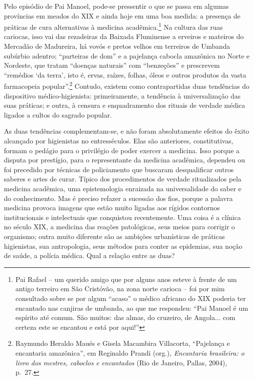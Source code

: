Pelo episódio de Pai Manoel, pode-se pressentir o que se passa em
algumas províncias em meados do XIX e ainda hoje em uma boa medida: a
presença de práticas de cura alternativas à medicina
acadêmica.\footnote{Pai Rafael -- um querido amigo que por alguns anos
  esteve à frente de um antigo terreiro em São Cristóvão, na zona norte
  carioca -- foi por mim consultado sobre se por algum ``acaso'' o
  médico africano do XIX poderia ter encantado nas canjiras de umbanda,
  ao que me respondeu: ``Pai Manoel é um espírito até comum. São muitos:
  das almas, do cruzeiro, de Angola... com certeza este se encantou e
  está por aqui!''} Na cultura das ruas cariocas, isso vai das
rezadeiras da Baixada Fluminense a erveiros e mateiros do Mercadão de
Madureira, há vovós e pretos velhos em terreiros de Umbanda subúrbio
adentro; ``parteiras de dom'' e a pajelança cabocla amazônica no Norte e
Nordeste, que tratam ``doenças naturais'' com ``benzeções'' e prescrevem
``remédios `da terra', isto é, ervas, raízes, folhas, óleos e outros
produtos da vasta farmacopeia popular''.\footnote{Raymundo Heraldo Maués
  e Gisela Macambira Villacorta, ``Pajelança e encantaria amazônica'',
  em Reginaldo Prandi (org.), \emph{Encantaria brasileira: o livro dos
  mestres, caboclos e encantados} (Rio de Janeiro, Pallas, 2004), p.~27.}
Contudo, existem como contrapartidas duas tendências do dispositivo
médico-higienista: primeiramente, a tendência à universalização das suas
práticas; e outra, à censura e enquadramento dos rituais de verdade
médica ligados a cultos do sagrado popular.

As duas tendências complementam-se, e não foram absolutamente efeitos do
êxito alcançado por higienistas no entresséculos. Elas são anteriores,
constitutivas, formam o pedágio para o privilégio de poder exercer a
medicina. Isso porque a disputa por prestígio, para o representante da
medicina acadêmica, dependeu ou foi precedido por técnicas de
policiamento que buscaram desqualificar outros saberes e artes de curar.
Típico dos procedimentos de verdade ritualizados pela medicina
acadêmica, uma epistemologia enraizada na universalidade do saber e do
conhecimento. Mas é preciso refazer a sucessão dos fios, porque a
palavra medicina provoca imagens que estão muito ligadas aos rígidos
contornos institucionais e intelectuais que conquistou recentemente. Uma
coisa é a clínica no século XIX, a medicina das reações patológicas,
seus meios para corrigir o organismo; outra muito diferente são as
ambições urbanísticas de práticas higienistas, sua antropologia, seus
métodos para conter as epidemias, sua noção de saúde, a polícia médica.
Qual a relação entre as duas?

